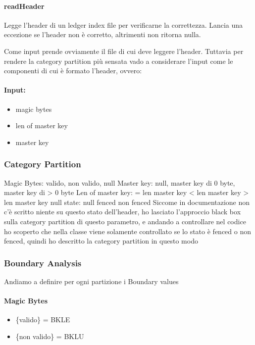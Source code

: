 \documentclass[12pt, a4paper]{article}
\begin{document}
\paragraph{readHeader}
Legge l'header di un ledger index file per verificarne la correttezza.
Lancia una eccezione se l'header non è corretto, altrimenti non ritorna nulla.

Come input prende ovviamente il file di cui deve leggere l'header. Tuttavia per rendere la category partition più sensata
vado a considerare l'input come le componenti di cui è formato l'header, ovvero:
\paragraph{Input:}
\begin{itemize}
  \item magic bytes
  \item len of master key
  \item master key
\end{itemize}

\subsubsection{Category Partition}
Magic Bytes: {valido}, {non valido}, {null}
Master key: {null}, {master key di 0 byte}, {master key di > 0 byte}
Len of master key: { = len master key} {< len master key} {> len master key} {null}
state: {null} {fenced} {non fenced}
Siccome in documentazione non c'è scritto niente su questo stato dell'header, ho lasciato 
l'approccio black box sulla category partition di questo parametro, e andando a controllare nel codice
ho scoperto che nella classe viene solamente controllato se lo stato è fenced o non fenced, quindi ho descritto 
la category partition in questo modo


\subsubsection{Boundary Analysis}
Andiamo a definire per ogni partizione i Boundary values

\paragraph{Magic Bytes}
\begin{itemize}
  \item \{valido\} = BKLE
  \item \{non valido\} = BKLU 
\end{itemize}
\end{document}

